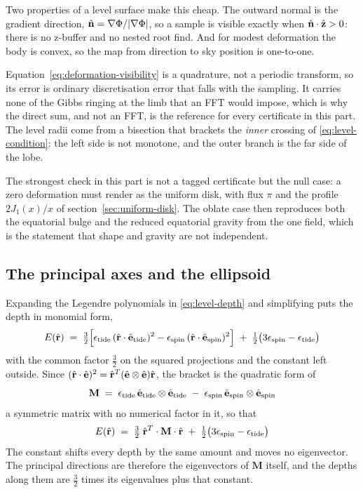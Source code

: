 Two properties of a level surface make this cheap.  The outward normal is the gradient direction,
$\hat{\mathbf n} = \nabla\Phi/|\nabla\Phi|$, so a sample is visible exactly when
$\hat{\mathbf n}\cdot\hat{\mathbf z} > 0$: there is no z-buffer and no nested root find.  And for
modest deformation the body is convex, so the map from direction to sky position is one-to-one.

Equation~\eqref{eq:deformation-visibility} is a quadrature, not a periodic transform, so its
error is ordinary discretisation error that falls with the sampling.  It carries none of the
Gibbs ringing at the limb that an FFT would impose, which is why the direct sum, and not an
FFT, is the reference for every certificate in this part.  The level radii come from a
bisection that brackets the \emph{inner} crossing of \eqref{eq:level-condition}: the left
side is not monotone, and the outer branch is the far side of the lobe.

The strongest check in this part is not a tagged certificate but the null case: a zero
deformation must render as the uniform disk, with flux $\pi$ and the profile
$2J_1(x)/x$ of section~\ref{sec:uniform-disk}.  The oblate case then reproduces both the
equatorial bulge and the reduced equatorial gravity from the one field, which is the
statement that shape and gravity are not independent.

\subsection{The principal axes and the ellipsoid}
\label{sec:deformation-axes}

Expanding the Legendre polynomials in \eqref{eq:level-depth} and simplifying puts the depth
in monomial form,
\begin{equation}
  E(\hat{\mathbf r}) \;=\; \tfrac32\Bigl[
    \epsilon_\text{tide}\,(\hat{\mathbf r}\cdot\hat{\mathbf e}_\text{tide})^2
    - \epsilon_\text{spin}\,(\hat{\mathbf r}\cdot\hat{\mathbf e}_\text{spin})^2\Bigr]
    \;+\; \tfrac12\bigl(3\epsilon_\text{spin} - \epsilon_\text{tide}\bigr)
  \label{eq:depth-form}
\end{equation}
with the common factor $\tfrac32$ on the squared projections and the constant left outside.  Since
$(\hat{\mathbf r}\cdot\hat{\mathbf e})^2 = \hat{\mathbf r}^{T}
(\hat{\mathbf e}\otimes\hat{\mathbf e})\hat{\mathbf r}$, the bracket is the quadratic form of
\begin{equation}
  \mathbf{M} \;=\; \epsilon_\text{tide}\,
    \hat{\mathbf e}_\text{tide}\otimes\hat{\mathbf e}_\text{tide}
    \;-\; \epsilon_\text{spin}\,
    \hat{\mathbf e}_\text{spin}\otimes\hat{\mathbf e}_\text{spin}
  \label{eq:depth-tensor}
\end{equation}
a symmetric matrix with no numerical factor in it, so that
\begin{equation}
  E(\hat{\mathbf r}) \;=\; \tfrac32\;\hat{\mathbf r}^{T}\cdot\mathbf{M}\cdot\hat{\mathbf r}
    \;+\; \tfrac12\bigl(3\epsilon_\text{spin} - \epsilon_\text{tide}\bigr)
  \label{eq:depth-quadratic}
\end{equation}
The constant shifts every depth by the same amount and moves no eigenvector.  The principal
directions are therefore the eigenvectors of $\mathbf{M}$ itself, and the depths along them are
$\tfrac32$ times its eigenvalues plus that constant.

